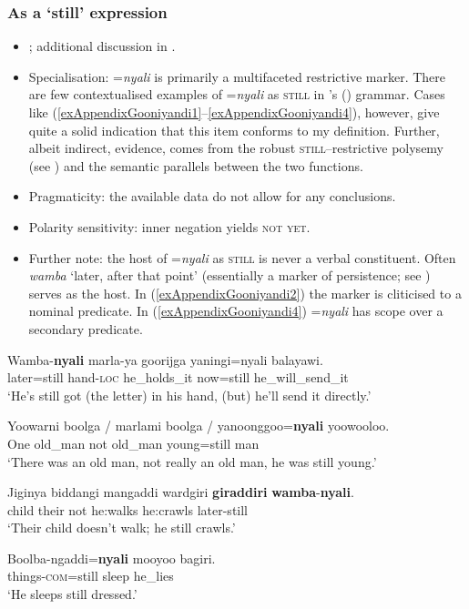 \subsubsection{As a \lq{}still\rq{} expression}
\label{appendixGooniyandiStill}
\begin{itemize}
	\item \textcite[463–464]{McGregor1990}; additional discussion in \textcite{SchultzeBerndt2002}.
	\item Specialisation: \mbox{=\textit{nyali}} is primarily a multifaceted restrictive marker. There are few contextualised examples of \mbox{=\textit{nyali}} as \textsc{still} in \citeauthor{McGregor1990}'s (\citeyear{McGregor1990}) grammar. Cases like (\ref{exAppendixGooniyandi1}–\ref{exAppendixGooniyandi4}), however, give quite a solid indication that this item conforms to my definition. Further, albeit indirect, evidence, comes from the robust \textsc{still}–restrictive polysemy (see ) and the semantic parallels between the two functions. 
	\item Pragmaticity: the available data do not allow for any conclusions.
	\item Polarity sensitivity: inner negation yields \textsc{not yet}.
	\item Further note: the host of \mbox{=\textit{nyali}} as \textsc{still} is never a verbal constituent. Often \textit{wamba} \lq later, after that point' (essentially a marker of persistence; see \cite[511–512]{McGregor1990}) serves as the host. In (\ref{exAppendixGooniyandi2}) the marker is cliticised to a nominal predicate. In (\ref{exAppendixGooniyandi4}) \mbox{=\textit{nyali}} has scope over a secondary predicate.
\end{itemize}
\begin{exe}
	\ex\label{exAppendixGooniyandi1} 
	\gll Wamba-\textbf{nyali} marla-ya goorijga yaningi=nyali balayawi.\\
	later=still hand-\textsc{loc} he\_holds\_it now=still he\_will\_send\_it\\
	\glt \lq He’s still got (the letter) in his hand, (but) he’ll send it directly.' \parencite[509–510]{McGregor1990}
	
	\ex\label{exAppendixGooniyandi2} 
	\gll Yoowarni boolga / marlami boolga / yanoonggoo=\textbf{nyali} yoowooloo.\\
	One old\_man {} not old\_man {} young=still man\\
	\glt \lq There was an old man, not really an old man, he was still young.' \parencite[315]{McGregor1990}
	
		\ex 
	\gll Jiginya biddangi mangaddi wardgiri \textbf{giraddiri} \textbf{wamba}-\textbf{nyali}.\\
	child their not he:walks he:crawls later-still\\
	\glt \lq Their child doesn’t walk; he still crawls.\rq{ }\parencite[464]{McGregor1990}
	
	\ex\label{exAppendixGooniyandi4}
	\gll Boolba-ngaddi=\textbf{nyali} mooyoo bagiri.\\
	things-\textsc{com}=still sleep he\_lies\\
	\glt \lq He sleeps still dressed.'  \parencite[355]{McGregor1990}
\end{exe}

